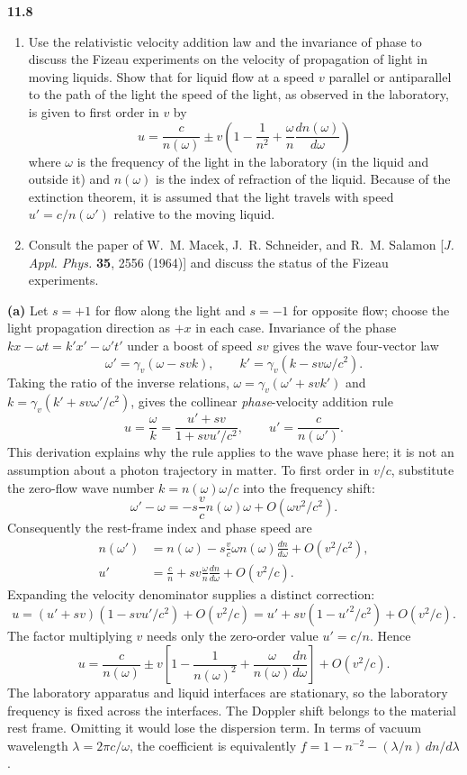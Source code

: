 \par\bigskip
\noindent\textbf{11.8}\quad\begin{enumerate}
\item[(a)] Use the relativistic velocity addition law and the invariance of phase to discuss the Fizeau experiments on the velocity of propagation of light in moving liquids. Show that for liquid flow at a speed $v$ parallel or antiparallel to the path of the light the speed of the light, as observed in the laboratory, is given to first order in $v$ by
\[
u=\frac{c}{n(\omega)}\pm v\left(1-\frac{1}{n^{2}}+\frac{\omega}{n}\frac{dn(\omega)}{d\omega}\right)
\]
where $\omega$ is the frequency of the light in the laboratory (in the liquid and outside it) and $n(\omega)$ is the index of refraction of the liquid. Because of the extinction theorem, it is assumed that the light travels with speed $u'=c/n(\omega')$ relative to the moving liquid.
\item[(b)] Consult the paper of W.~M. Macek, J.~R. Schneider, and R.~M. Salamon [\emph{J. Appl. Phys.} \textbf{35}, 2556 (1964)] and discuss the status of the Fizeau experiments.
\end{enumerate}
\solution
\textbf{(a)} Let $s=+1$ for flow along the light and $s=-1$
for opposite flow; choose the light propagation direction as $+x$
in each case. Invariance of the phase $kx-\omega t=k'x'-\omega't'$
under a boost of speed $sv$ gives the wave four-vector law
\[
\omega'=\gamma_v(\omega-svk),\qquad
k'=\gamma_v(k-sv\omega/c^2).
\]
Taking the ratio of the inverse relations,
$\omega=\gamma_v(\omega'+svk')$ and
$k=\gamma_v(k'+sv\omega'/c^2)$, gives the collinear
\emph{phase}-velocity addition rule
\[
u=\frac{\omega}{k}=\frac{u'+sv}{1+svu'/c^2},
\qquad u'=\frac{c}{n(\omega')}.
\]
This derivation explains why the rule applies to the wave phase
here; it is not an assumption about a photon trajectory in matter.
To first order in $v/c$, substitute the zero-flow wave number
$k=n(\omega)\omega/c$ into the frequency shift:
\[
\omega'-\omega=-s\frac vc n(\omega)\omega+O(\omega v^2/c^2).
\]
Consequently the rest-frame index and phase speed are
\begin{align*}
n(\omega')&=n(\omega)-s\frac vc\omega n(\omega)
\frac{dn}{d\omega}+O(v^2/c^2),\\
u'&=\frac cn+s v\frac\omega n\frac{dn}{d\omega}+O(v^2/c).
\end{align*}
Expanding the velocity denominator supplies a distinct correction:
\[
u=(u'+sv)(1-svu'/c^2)+O(v^2/c)
=u'+sv(1-u'^2/c^2)+O(v^2/c).
\]
The factor multiplying $v$ needs only the zero-order value
$u'=c/n$. Hence
\[
\boxed{u=\frac{c}{n(\omega)}\pm v\left[
1-\frac1{n(\omega)^2}+\frac\omega{n(\omega)}\frac{dn}{d\omega}\right]
+O(v^2/c).}
\]
The laboratory apparatus and liquid interfaces are stationary, so
the laboratory frequency is fixed across the interfaces. The
Doppler shift belongs to the material rest frame. Omitting it
would lose the dispersion term. In terms of vacuum wavelength
$\lambda=2\pi c/\omega$, the coefficient is equivalently
$f=1-n^{-2}-(\lambda/n)\,dn/d\lambda$.

